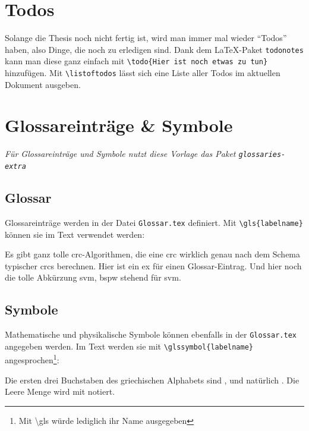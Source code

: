 	\section{Todos}
			Solange die Thesis noch nicht fertig ist, wird man immer mal wieder \enquote{Todos} haben, also Dinge, die noch zu erledigen sind.
			Dank dem \LaTeX-Paket \lstinline[language=thesis-latexbeispiel]|todonotes| kann man diese ganz einfach mit \lstinline[language=thesis-latexbeispiel]|\todo{Hier ist noch etwas zu tun}| hinzufügen.
			Mit \lstinline[language=thesis-latexbeispiel]|\listoftodos| lässt sich eine Liste aller Todos im aktuellen Dokument ausgeben.
		
	\section{Glossareinträge \& Symbole}
		\emph{Für Glossareinträge und Symbole nutzt diese Vorlage das Paket \lstinline|glossaries-extra|}
		\medskip
		
		\subsection{Glossar}
			Glossareinträge werden in der Datei \lstinline|Glossar.tex| definiert. Mit \lstinline[language=thesis-latexbeispiel]|\gls{labelname}| können sie im Text verwendet werden:
%			
			\begin{vorlagenbeispiel}
				Es gibt ganz tolle \gls{crc}-Algorithmen, die eine \gls{crc} wirklich genau nach dem Schema typischer \glspl{crc} berechnen.
				Hier ist ein \gls{ex} für einen Glossar-Eintrag. 
				Und hier noch die tolle Abkürzung \gls{svm}, \gls{bspw} stehend für \gls{svm}.
			\end{vorlagenbeispiel}
		\subsection{Symbole}
			Mathematische und physikalische Symbole können ebenfalls in der \lstinline|Glossar.tex| angegeben werden.
			Im Text werden sie mit \lstinline[language=thesis-latexbeispiel]|\glssymbol{labelname}| angesprochen\footnote{Mit \textbackslash gls würde lediglich ihr Name ausgegeben}:
%			
			\begin{vorlagenbeispiel}
				Die ersten drei Buchstaben des griechischen Alphabets sind ,  und natürlich . Die Leere Menge wird mit  notiert.
			\end{vorlagenbeispiel}